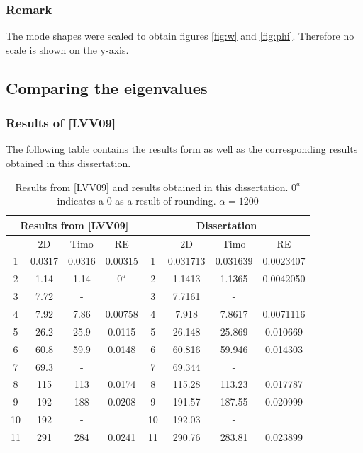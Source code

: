 \documentclass[../../main.tex]{subfiles}
\begin{document}
\subsubsection{Remark}
The mode shapes were scaled to obtain figures \ref{fig:w} and \ref{fig:phi}. Therefore no scale is shown on the y-axis.

\subsection{Comparing the eigenvalues}
\subsubsection{Results of [LVV09]}
The following table contains the results form \cite{LVV09} as well as the corresponding results obtained in this dissertation.
\begin{table}[!ht]
	\centering
	\caption{Results from [LVV09] and results obtained in this dissertation. $0^a$ indicates a 0 as a result of rounding. $\alpha = 1200$}
	\begin{tabular}{|c|c|c|c||c|c|c|c|}
		\hline
		\multicolumn{4}{|c||}{Results from [LVV09]} & \multicolumn{4}{c|}{Dissertation} \\ \hline \hline
		~ & 2D & Timo & RE & ~ & 2D & Timo & RE  \\ \hline
		1 & 0.0317 & 0.0316 & 0.00315 & 1 & 0.031713 & 0.031639 & 0.0023407  \\ 
		2 & 1.14 & 1.14 & $0^a$ & 2 & 1.1413 & 1.1365 &  0.0042050 \\ 
		3 & 7.72 & - & ~ & 3 & 7.7161 & - &   \\ 
		4 & 7.92 & 7.86 & 0.00758 & 4 & 7.918 & 7.8617 & 0.0071116    \\ 
		5 & 26.2 & 25.9 & 0.0115 & 5 & 26.148 & 25.869 & 0.010669  \\ 
		6 & 60.8 & 59.9 & 0.0148 & 6 & 60.816 & 59.946 & 0.014303  \\ 
		7 & 69.3 & - & ~ & 7 & 69.344 & - &    \\ 
		8 & 115 & 113 & 0.0174 & 8 & 115.28 & 113.23 &  0.017787  \\ 
		9 & 192 & 188 & 0.0208 & 9 & 191.57 & 187.55 &  0.020999  \\ 
		10 & 192 & - &  & 10 & 192.03 & - &   \\ 
		11 & 291 & 284 & 0.0241 & 11 & 290.76 & 283.81 &  0.023899  \\ \hline
	\end{tabular}\label{Results_LVV09}
\end{table}
\end{document}
